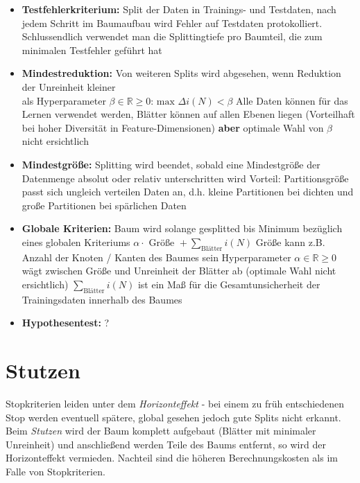 \documentclass{report}
\begin{document}
  \begin{itemize}	
    \item \textbf{Testfehlerkriterium:} Split der Daten in Trainings- und Testdaten, nach jedem Schritt im Baumaufbau wird Fehler auf	
    Testdaten protokolliert. Schlussendlich verwendet man die Splittingtiefe pro Baumteil, die zum minimalen Testfehler geführt hat	
    \item \textbf{Mindestreduktion:} Von weiteren Splits wird abgesehen, wenn Reduktion der Unreinheit kleiner\\	
    als Hyperparameter $\beta \in \mathbb{R} \geq 0$: $\text{max } \Delta i(N) < \beta$	
    \subitem Alle Daten können für das Lernen verwendet werden, Blätter können	
    \subitem auf allen Ebenen liegen (Vorteilhaft bei hoher Diversität	
    \subitem in Feature-Dimensionen) \textbf{aber} optimale Wahl von $\beta$ nicht ersichtlich	
    \item \textbf{Mindestgröße:} Splitting wird beendet, sobald eine Mindestgröße der Datenmenge absolut oder relativ unterschritten	
    wird	
    \subitem Vorteil: Partitionsgröße passt sich ungleich verteilen Daten an, d.h.	
    \subitem kleine Partitionen bei dichten und	
    \subitem große Partitionen bei spärlichen Daten	
    \item \textbf{Globale Kriterien:} Baum wird solange gesplitted bis Minimum bezüglich eines globalen Kriteriums	
    $\alpha \cdot \text{ Größe } + \sum_{\text{Blätter}}i(N)$	
    \subitem Größe kann z.B. Anzahl der Knoten / Kanten des Baumes sein	
    \subitem Hyperparameter $\alpha \in \mathbb{R} \geq 0$ wägt zwischen	
    \subitem Größe und Unreinheit der Blätter ab (optimale Wahl nicht ersichtlich)	
    \subitem $\sum_{\text{Blätter}}i(N)$ ist ein Maß für die Gesamtunsicherheit	
    \subitem der Trainingsdaten innerhalb des Baumes	
    \item \textbf{Hypothesentest:} ?	
  \end{itemize}	
  
  \section{Stutzen}	
  
  Stopkriterien leiden unter dem \textit{Horizonteffekt} - bei einem zu früh entschiedenen Stop werden eventuell spätere,	
  global gesehen jedoch gute Splits nicht erkannt. Beim \textit{Stutzen} wird der Baum komplett aufgebaut (Blätter mit minimaler	
  Unreinheit) und anschließend werden Teile des Baums entfernt, so wird der Horizonteffekt vermieden. Nachteil sind die höheren	
  Berechnungskosten als im Falle von Stopkriterien.	
  
\end{document}
